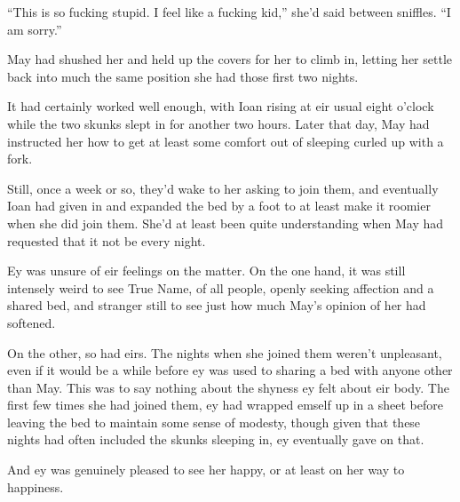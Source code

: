 ``This is so fucking stupid. I feel like a fucking kid,'' she'd said between sniffles. ``I am sorry.''

May had shushed her and held up the covers for her to climb in, letting her settle back into much the same position she had those first two nights.

It had certainly worked well enough, with Ioan rising at eir usual eight o'clock while the two skunks slept in for another two hours. Later that day, May had instructed her how to get at least some comfort out of sleeping curled up with a fork.

Still, once a week or so, they'd wake to her asking to join them, and eventually Ioan had given in and expanded the bed by a foot to at least make it roomier when she did join them. She'd at least been quite understanding when May had requested that it not be every night.

Ey was unsure of eir feelings on the matter. On the one hand, it was still intensely weird to see True Name, of all people, openly seeking affection and a shared bed, and stranger still to see just how much May's opinion of her had softened.

On the other, so had eirs. The nights when she joined them weren't unpleasant, even if it would be a while before ey was used to sharing a bed with anyone other than May. This was to say nothing about the shyness ey felt about eir body. The first few times she had joined them, ey had wrapped emself up in a sheet before leaving the bed to maintain some sense of modesty, though given that these nights had often included the skunks sleeping in, ey eventually gave on that.

And ey was genuinely pleased to see her happy, or at least on her way to happiness.
